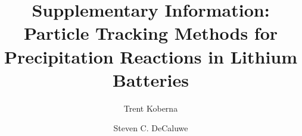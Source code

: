 \documentclass[final,3p,times,onecolumn]{elsarticle}    %
\begin{document}
\begin{frontmatter}
\title{Supplementary Information: Particle Tracking Methods for Precipitation Reactions in Lithium Batteries}

\author[CSM]{Trent Koberna}
\author[CSM]{Steven C. DeCaluwe }
        
\address[CSM]{Colorado School of Mines, 1500 Illinois St, Golden, CO 80401}
\end{frontmatter}




\end{document}
